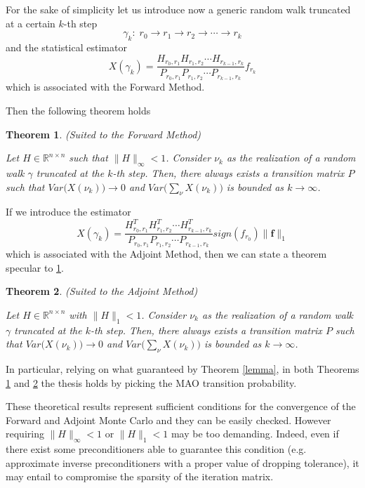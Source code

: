 \documentclass[a4paper,10pt]{article}
\newtheorem{thm}{Theorem}
\begin{document}
For the sake of simplicity let us introduce now a generic random walk
truncated at a certain $k$-th step
\[
 \gamma_k:\; r_0\rightarrow r_1 \rightarrow r_2 \rightarrow \cdots \rightarrow
r_k
\]
and the statistical estimator
\[
 X(\gamma_k)=\frac{H_{r_0,r_1}H_{r_1,r_2}\cdots
H_{r_{k-1},r_k}}{P_{r_0,r_1}P_{r_1,r_2}\cdots P_{r_{k-1},r_k}}f_{r_k}
\]
which is associated with the Forward Method.

Then the following theorem holds
\begin{thm}\textit{(Suited to the Forward Method)}

Let $H\in \mathbb{R}^{n\times n}$ such that $\lVert H\rVert_{\infty}<1$.
Consider $\nu_k$ as the realization of a random walk $\gamma$ truncated at the
$k$-th step. Then,
there always exists a
transition matrix $P$ such that
$Var\Big(X(\nu_k)\Big)\rightarrow 0$ and
$Var\Big(\sum_{\nu}X(\nu_k)\Big)$ is bounded as $k\rightarrow \infty$.
\label{for_thm}
\end{thm}

If we introduce the estimator
\[
 X(\gamma_k)=\frac{H^T_{r_0,r_1}H^T_{r_1,r_2}\cdots
H^T_{r_{k-1},r_k}}{P_{r_0,r_1}P_{r_1,r_2}\cdots
P_{r_{k-1},r_k}}sign(f_{r_0})\lVert \mathbf{f}\rVert_1
\]
which is associated with the Adjoint Method, then we can state a
theorem specular to \ref{for_thm}.

\begin{thm}\textit{(Suited to the Adjoint Method)}

 Let $H\in \mathbb{R}^{n\times n}$ with $\lVert H\rVert_{1}<1$.
Consider $\nu_k$ as the realization of a random walk $\gamma$ truncated at the
$k$-th step. Then,
there always exists a
transition matrix $P$ such that
$Var\Big(X(\nu_k)\Big)\rightarrow 0$ and
$Var\Big(\sum_{\nu}X(\nu_k)\Big)$ is bounded as $k\rightarrow \infty$.
\label{adj_thm}
\end{thm}

In particular, relying on what guaranteed by Theorem \ref{lemma}, in both
Theorems \ref{for_thm} and \ref{adj_thm} the thesis holds by picking the MAO
transition probability.

These theoretical results represent sufficient conditions for the convergence
of the
Forward and Adjoint Monte Carlo and they can be easily checked.
However requiring $\lVert
H\rVert_{\infty}<1$ or $\lVert H\rVert_1<1$ may be too demanding.
Indeed, even if there exist some preconditioners able to guarantee this
condition (e.g. approximate inverse preconditioners with a proper value of
dropping
tolerance), it may entail to compromise the sparsity of the
iteration
matrix.
\end{document}
